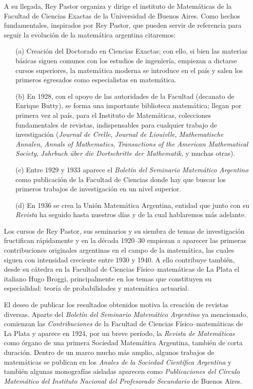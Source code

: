 A su llegada, Rey Pastor organiza y dirige el instituto de Matemáticas de la
Facultad de Ciencias Exactas de la Universidad de Buenos Aires. Como hechos
fundamentales, inspirados por Rey Pastor, que pueden servir de referencia para
seguir la evolución de la matemática argentina citaremos: 
\begin{enumerate}
	\item[(a)] Creación del Doctorado en Ciencias Exactas; con ello, si bien las
		materias básicas siguen comunes con los estudios de ingeniería,
		empiezan a dictarse cursos superiores, la matemática moderna se
		introduce en el país y salen los primeros egresados como especialistas
		en matemática.
	\item[(b)] En 1928, con el apoyo de las autoridades de la Facultad
		(decanato de Enrique Butty), se forma una importante biblioteca
		matemática; llegan por primera vez al país, para el Instituto de
		Matemáticas, colecciones fundamentales de revistas, indispensables para
		cualquier trabajo de investigación (\emph{Journal de Crelle},
		\emph{Journal de Liouivlle}, \emph{Mathematische Annalen}, \emph{Annals
		of Mathematics}, \emph{Transactions of the American Mathematical
		Society}, \emph{Jahrbuch \"uber die Dortschritte der Mathematik}, y
		muchas otras). 
	\item [(c)] Entre 1929 y 1933 aparece el \emph{Boletín del Seminario
		Matemático Argentino} como publicación de la Facultad de Ciencias donde
		hay que buscar los primeros trabajos de investigación en un nivel
		superior. 
	\item [(d)] En 1936 se crea la Unión Matemática Argentina, entidad que
		junto con su \emph{Revista} ha seguido hasta nuestros días y de la cual
		hablaremos más adelante.
\end{enumerate}

Los cursos de Rey Pastor, sus seminarios y su siembra de temas de investigación
fructifican rápidamente y en la década 1920--30 empiezan a aparecer las
primeras contribuciones originales argentinas en el campo de la matemática, las
cuales siguen con intensidad creciente entre 1930 y 1940. A ello contribuye
también, desde su cátedra en la Facultad de Ciencias Físico--matemáticas de La
Plata el italiano Hugo Broggi, principalmente en los temas que constituyen su
especialidad: teoría de probabilidades y matemática actuarial. 

El deseo de publicar los resultados obtenidos motiva la creación de revistas
diversas. Aparte del \emph{Boletín del Seminario Matemático Argentino} ya
mencionado, comienzan las \emph{Contribuciones} de la Facultad de Ciencias
Físico--matemáticas de La Plata y aparece en 1924, por un breve período, la
\emph{Revista de Matemáticas} como órgano de una primera Sociedad Matemática
Argentina, también de corta duración. Dentro de un marco mucho más amplio,
algunos trabajos de matemáticas se publican en los \emph{Anales de la Sociedad
Científica Argentina} y también algunas monografías aisladas aparecen como
\emph{Publicaciones del Círculo Matemático del Instituto Nacional del
Profesorado Secundario} de Buenos Aires.

